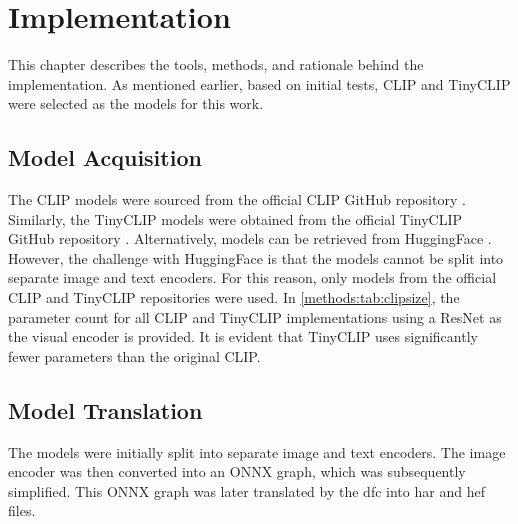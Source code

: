 \chapter{Implementation
    \label{chapter:implementation}}

This chapter describes the tools, methods, and rationale behind the implementation. 
As mentioned earlier, based on initial tests, CLIP and TinyCLIP were selected as the models for this work.


\section{Model Acquisition}

The CLIP models were sourced from the official CLIP GitHub repository \cite{clipgit}.
Similarly, the TinyCLIP models were obtained from the official TinyCLIP GitHub repository \cite{tinyclipgit}.
Alternatively, models can be retrieved from HuggingFace \cite{huggingface}.
However, the challenge with HuggingFace is that the models cannot be split into separate image and text encoders.
For this reason, only models from the official CLIP and TinyCLIP repositories were used.
In \cref{methods:tab:clipsize}, the parameter count for all CLIP and TinyCLIP implementations using a ResNet as the visual encoder is provided.
It is evident that TinyCLIP uses significantly fewer parameters than the original CLIP.

\section{Model Translation
\label{implementation:sec:translation}}

The models were initially split into separate image and text encoders.
The image encoder was then converted into an ONNX graph, which was subsequently simplified.
This ONNX graph was later translated by the \acrshort{dfc} into \acrshort{har} and \acrshort{hef} files.


